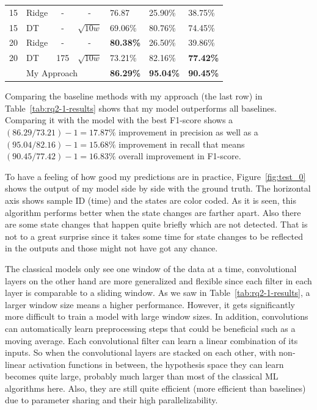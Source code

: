 \begin{table}
{\begin{tabular}{clcclll}
15 & Ridge & -   & -          & 76.87 & 25.90\% & 38.75\% \\
15 & DT    & -   & $\sqrt{10w}$ & 69.06\% & 80.76\% & 74.45\% \\ \midrule
20 & Ridge & -   & -          & \textbf{80.38\%} & 26.50\% & 39.86\% \\
20 & DT    & 175 & $\sqrt{10w}$ & 73.21\% & 82.16\% & \textbf{77.42\%} \\  \midrule
   & \multicolumn{3}{l}{My Approach} & \textbf{86.29\%} & \textbf{95.04\%} & \textbf{90.45\%} \\
\bottomrule
\end{tabular}%
}
\end{table}

Comparing the baseline methods with my approach (the last row) in Table~\ref{tab:rq2-1-results} shows that my model outperforms all baselines. Comparing it with the model with the best F1-score shows a $(86.29/73.21)-1=17.87\%$ improvement in precision as well as a $(95.04/82.16)-1=15.68\%$ improvement in recall that means $(90.45/77.42)-1=16.83\%$ overall improvement in F1-score. 

To have a feeling of how good my predictions are in practice, Figure~\ref{fig:test_0} shows the output of my model side by side with the ground truth. The horizontal axis shows sample ID (time) and the states are color coded. As it is seen, this algorithm performs better when the state changes are farther apart. Also there are some state changes that happen quite briefly which are not detected. That is not to a great surprise since it takes some time for state changes to be reflected in the outputs and those might not have got any chance.


The classical models only see one window of the data at a time, convolutional layers on the other hand are more generalized and flexible since each filter in each layer is comparable to a sliding window. As we saw in Table~\ref{tab:rq2-1-results}, a larger window size means a higher performance. However, it gets significantly more difficult to train a model with large window sizes. In addition, convolutions can automatically learn preprocessing steps that could be beneficial such as a moving average. Each convolutional filter can learn a linear combination of its inputs. So when the convolutional layers are stacked on each other, with non-linear activation functions in between, the hypothesis space they can learn becomes quite large, probably much larger than most of the classical ML algorithms here. Also, they are still quite efficient (more efficient than baselines) due to parameter sharing and their high parallelizability.

